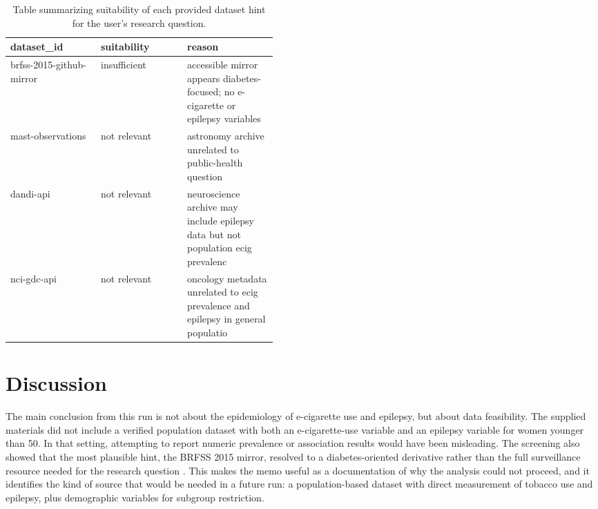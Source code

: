 \documentclass[11pt]{article}
\begin{document}
\begin{table}[tbp]
\centering
\caption{Table summarizing suitability of each provided dataset hint for the user's research question.}
\label{tab:artifact-2}
\begin{tabular}{>{\raggedright\arraybackslash}p{0.15\linewidth}>{\raggedright\arraybackslash}p{0.15\linewidth}>{\raggedright\arraybackslash}p{0.15\linewidth}}
\toprule
dataset\_id & suitability & reason \\
\midrule
brfss-2015-github-mirror & insufficient & accessible mirror appears diabetes-focused; no e-cigarette or epilepsy variables \\
mast-observations & not relevant & astronomy archive unrelated to public-health question \\
dandi-api & not relevant & neuroscience archive may include epilepsy data but not population ecig prevalenc \\
nci-gdc-api & not relevant & oncology metadata unrelated to ecig prevalence and epilepsy in general populatio \\
\bottomrule
\end{tabular}
\end{table}

\section{Discussion}
The main conclusion from this run is not about the epidemiology of e-cigarette use and epilepsy, but about data feasibility. The supplied materials did not include a verified population dataset with both an e-cigarette-use variable and an epilepsy variable for women younger than 50. In that setting, attempting to report numeric prevalence or association results would have been misleading. The screening also showed that the most plausible hint, the BRFSS 2015 mirror, resolved to a diabetes-oriented derivative rather than the full surveillance resource needed for the research question \cite{ref1}. This makes the memo useful as a documentation of why the analysis could not proceed, and it identifies the kind of source that would be needed in a future run: a population-based dataset with direct measurement of tobacco use and epilepsy, plus demographic variables for subgroup restriction.
\end{document}
